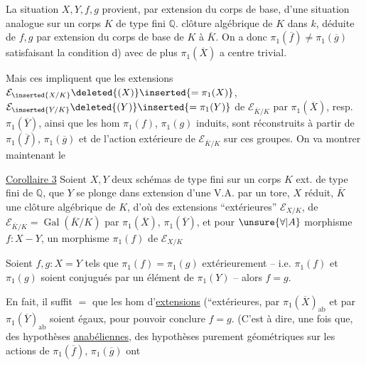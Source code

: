 La situation $X,Y,f,g$ provient, par extension du corps de base, d'une situation analogue sur un corps $K$  de type fini  $\mathbb Q$.   clôture algébrique  de $K$ dans $k$,   déduite de  $f,g$ par extension du corps de base de $K$ à $\overline K$. On a donc $\pi_1(\overline f)\ne\pi_1(\overline g)$ satisfaisant la condition d) avec de plus $\pi_1(\overline X)$ a centre trivial.

Mais ces  impliquent que les extensions $\mathcal E_{\inserted{X/K}}\deleted{(X)}\inserted{=\pi_1(X)}$, $\mathcal E_{\inserted{Y/K}}\deleted{(Y)}\inserted{=\pi_1(Y)}$ de $\mathcal E_{\overline K/K}$ par $\pi_1(\overline X)$, resp. $\pi_1(\overline Y)$, ainsi que les hom $\pi_1(f)$, $\pi_1(g)$ induits, sont réconstruits à partir de  $\pi_1(\overline f)$, $\pi_1(\overline g)$ et de l'action extérieure de $\mathcal E_{\overline K/K}$ sur ces groupes. On va montrer maintenant le

\uline{Corollaire 3} Soient  $X,Y$ deux schémas de type fini sur un corps $K$ ext. de type fini de $\mathbb Q$,   que $Y$ se plonge dans   extension d'une V.A. par un tore, $X$ réduit,   $\overline K$ une clôture algébrique de $K$, d'où des extensions ``extérieures'' $\mathcal E_{X/K}$,  de $\mathcal E_{\overline K/K}=\operatorname{Gal}(\overline K/K)$ par $\pi_1(\overline X)$, $\pi_1(\overline Y)$, et pour $\unsure{\forall|A}$ morphisme $f:X-Y$, un morphisme $\pi_1(f)$ de $\mathcal E_{X/K}$ 

Soient $f,g:X=Y$ tels que $\pi_1(f)=\pi_1(g)$ extérieurement -- i.e. $\pi_1(f)$ et $\pi_1(g)$ soient conjugués par un élément de $\pi_1(Y)$ -- alors $f=g$.

En fait, il suffit $=$ que les hom d'\uline{extensions} (``extérieures,  par $\pi_1(\overline X)_{\mathrm{ab}}$ et par $\pi_1(\overline Y)_{\mathrm{ab}}$ soient égaux, pour pouvoir conclure $f=g$. (C'est à dire, une fois que,   des hypothèses \uline{anabéliennes}, des hypothèses purement géométriques sur les actions de $\pi_1(\overline f)$, $\pi_1(\overline g)$ ont  

